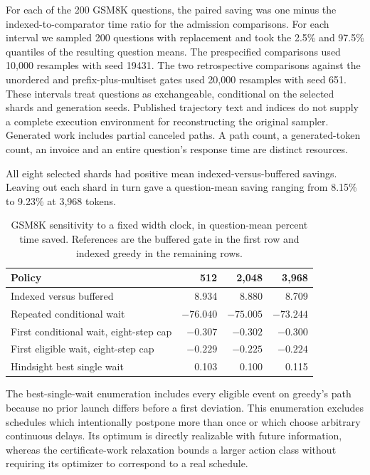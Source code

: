 For each of the 200 GSM8K questions, the paired saving was one minus the indexed-to-comparator time ratio for the admission comparisons. For each interval we sampled 200 questions with replacement and took the 2.5\% and 97.5\% quantiles of the resulting question means. The prespecified comparisons used 10,000 resamples with seed 19431. The two retrospective comparisons against the unordered and prefix-plus-multiset gates used 20,000 resamples with seed 651. These intervals treat questions as exchangeable, conditional on the selected shards and generation seeds. Published trajectory text and indices do not supply a complete execution environment for reconstructing the original sampler. Generated work includes partial canceled paths. A path count, a generated-token count, an invoice and an entire question's response time are distinct resources.

All eight selected shards had positive mean indexed-versus-buffered savings. Leaving out each shard in turn gave a question-mean saving ranging from 8.15\% to 9.23\% at 3,968 tokens.

\begin{table}[htbp]\centering
\caption{GSM8K sensitivity to a fixed width clock, in question-mean percent time saved. References are the buffered gate in the first row and indexed greedy in the remaining rows.}\label{tab:sens}
\begin{tabular}{lrrr}\toprule
Policy & 512 & 2,048 & 3,968\\\midrule
Indexed versus buffered & 8.934 & 8.880 & 8.709\\
Repeated conditional wait & $-76.040$ & $-75.005$ & $-73.244$\\
First conditional wait, eight-step cap & $-0.307$ & $-0.302$ & $-0.300$\\
First eligible wait, eight-step cap & $-0.229$ & $-0.225$ & $-0.224$\\
Hindsight best single wait & 0.103 & 0.100 & 0.115\\\bottomrule
\end{tabular}
\end{table}

The best-single-wait enumeration includes every eligible event on greedy's path because no prior launch differs before a first deviation. This enumeration excludes schedules which intentionally postpone more than once or which choose arbitrary continuous delays. Its optimum is directly realizable with future information, whereas the certificate-work relaxation bounds a larger action class without requiring its optimizer to correspond to a real schedule.

